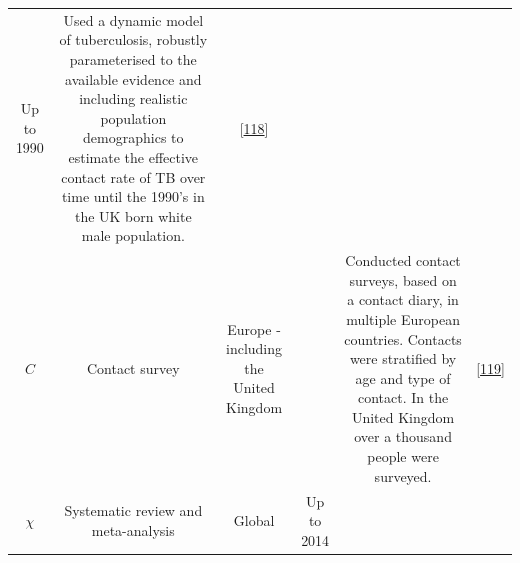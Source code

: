 \documentclass[11pt,twoside]{bristolthesis}
\begin{document}
\begin{longtable}[]{@{}cccccc@{}}
\begin{minipage}[t]{0.07\columnwidth}
  Up to
  1990\strut
  \end{minipage} & \begin{minipage}[t]{0.31\columnwidth}\centering
  Used a dynamic model of tuberculosis, robustly
  parameterised to the available evidence and
  including realistic population demographics to
  estimate the effective contact rate of TB over
  time until the 1990's in the UK born white male
  population.\strut
  \end{minipage} & \begin{minipage}[t]{0.10\columnwidth}\centering
  {[}\protect\hyperlink{ref-Vynnycky1999}{118}{]}\strut
  \end{minipage}\tabularnewline
  \begin{minipage}[t]{0.19\columnwidth}\centering
  \(C\)\strut
  \end{minipage} & \begin{minipage}[t]{0.09\columnwidth}\centering
  Contact
  survey\strut
  \end{minipage} & \begin{minipage}[t]{0.07\columnwidth}\centering
  Europe -
  including
  the
  United
  Kingdom\strut
  \end{minipage} & \begin{minipage}[t]{0.07\columnwidth}\centering
  2005\strut
  \end{minipage} & \begin{minipage}[t]{0.31\columnwidth}\centering
  Conducted contact surveys, based on a contact
  diary, in multiple European countries. Contacts
  were stratified by age and type of contact. In the
  United Kingdom over a thousand people were
  surveyed.\strut
  \end{minipage} & \begin{minipage}[t]{0.10\columnwidth}\centering
  {[}\protect\hyperlink{ref-Mossong2008}{119}{]}\strut
  \end{minipage}\tabularnewline
  \begin{minipage}[t]{0.19\columnwidth}\centering
  \(\chi\)\strut
  \end{minipage} & \begin{minipage}[t]{0.09\columnwidth}\centering
  Systematic
  review and
  meta-analysis\strut
  \end{minipage} & \begin{minipage}[t]{0.07\columnwidth}\centering
  Global\strut
  \end{minipage} & \begin{minipage}[t]{0.07\columnwidth}\centering
  Up to
  2014\strut

\end{minipage}
\end{longtable}
\end{document}
